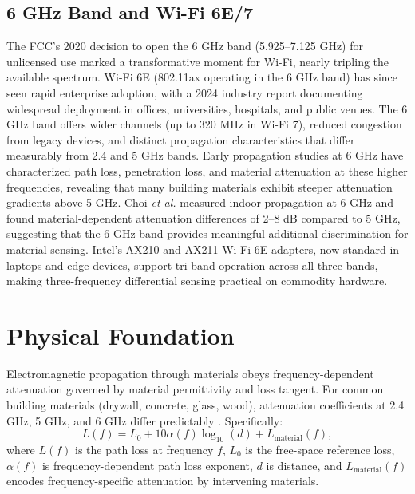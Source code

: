 \documentclass[conference]{IEEEtran}
\begin{document}
\subsection{6 GHz Band and Wi-Fi 6E/7}

The FCC's 2020 decision to open the 6 GHz band (5.925--7.125 GHz) for unlicensed use \cite{fcc-6ghz-2020} marked a transformative moment for Wi-Fi, nearly tripling the available spectrum. Wi-Fi 6E (802.11ax operating in the 6 GHz band) has since seen rapid enterprise adoption, with a 2024 industry report \cite{wifi-alliance-6ghz-2024} documenting widespread deployment in offices, universities, hospitals, and public venues. The 6 GHz band offers wider channels (up to 320 MHz in Wi-Fi 7), reduced congestion from legacy devices, and distinct propagation characteristics that differ measurably from 2.4 and 5 GHz bands. Early propagation studies at 6 GHz \cite{6ghz-propagation-study-2023} have characterized path loss, penetration loss, and material attenuation at these higher frequencies, revealing that many building materials exhibit steeper attenuation gradients above 5 GHz. Choi \emph{et al.} \cite{choi-6ghz-indoor-2024} measured indoor propagation at 6 GHz and found material-dependent attenuation differences of 2--8 dB compared to 5 GHz, suggesting that the 6 GHz band provides meaningful additional discrimination for material sensing. Intel's AX210 and AX211 Wi-Fi 6E adapters, now standard in laptops and edge devices, support tri-band operation across all three bands, making three-frequency differential sensing practical on commodity hardware.

\section{Physical Foundation}

Electromagnetic propagation through materials obeys frequency-dependent attenuation governed by material permittivity and loss tangent. For common building materials (drywall, concrete, glass, wood), attenuation coefficients at 2.4 GHz, 5 GHz, and 6 GHz differ predictably \cite{nist-material-attenuation-1997, 6ghz-propagation-study-2023}. Specifically:
\begin{equation}
L(f) = L_0 + 10 \alpha(f) \log_{10}(d) + L_{\text{material}}(f),
\end{equation}
where $L(f)$ is the path loss at frequency $f$, $L_0$ is the free-space reference loss, $\alpha(f)$ is frequency-dependent path loss exponent, $d$ is distance, and $L_{\text{material}}(f)$ encodes frequency-specific attenuation by intervening materials.
\end{document}
